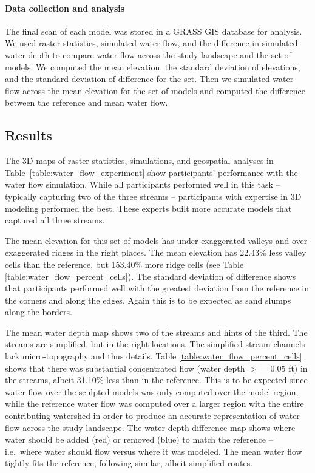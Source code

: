 \documentclass[Afour,sagev,times]{sagej} %
\begin{document}
\paragraph{Data collection and analysis}
The final scan of each model was stored 
in a GRASS GIS database for analysis. 
We used raster statistics, simulated water flow, 
and the difference in simulated water depth 
to compare water flow across the study landscape 
and the set of models.
We computed the mean elevation,
the standard deviation of elevations, 
and the standard deviation of difference for the set.
Then we simulated water flow across 
the mean elevation for the set of models
and computed the difference 
between the reference and mean water flow. 

\subsection{Results}
The 3D maps of raster statistics, simulations, and geospatial analyses in
Table~\ref{table:water_flow_experiment} 
show participants' performance with the water flow simulation.
While all participants performed well in this task
-- typically capturing two of the three streams -- 
participants with expertise in 3D modeling performed the best.
These experts built more accurate models
that captured all three streams.

The mean elevation for this set of models
has under-exaggerated valleys and 
over-exaggerated ridges in the right places. 
The mean elevation has 22.43\% less valley cells than the reference, 
but 153.40\% more ridge cells
(see Table \ref{table:water_flow_percent_cells}). 
The standard deviation of difference 
shows that participants performed well 
with the greatest deviation from the reference
in the corners and along the edges. 
Again this is to be expected 
as sand slumps along the borders. 

The mean water depth map shows two of the streams 
and hints of the third.
The streams are simplified, but in the right locations. 
The simplified stream channels lack micro-topography
and thus details. 
Table \ref{table:water_flow_percent_cells} shows that 
there was substantial concentrated flow (water depth $>=0.05$ ft) 
in the streams, albeit 31.10\% less than in the reference.
This is to be expected since 
water flow over the sculpted models 
was only computed over the model region, while 
the reference water flow 
was computed over a larger region 
with the entire contributing watershed 
in order to produce an accurate representation 
of water flow across the study landscape. 
The water depth difference map shows
where water should be added (red) or removed (blue) 
to match the reference
-- i.e.~where water should flow versus where it was modeled. 
The mean water flow tightly fits the reference, 
following similar, albeit simplified routes.
\end{document}
